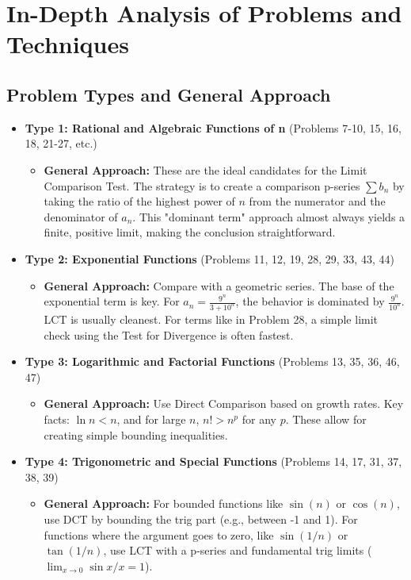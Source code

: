 \documentclass{article}
\begin{document}
\section{In-Depth Analysis of Problems and Techniques}

\subsection{Problem Types and General Approach}
\begin{itemize}
    \item \textbf{Type 1: Rational and Algebraic Functions of n} (Problems 7-10, 15, 16, 18, 21-27, etc.)
    \begin{itemize}
        \item \textbf{General Approach:} These are the ideal candidates for the Limit Comparison Test. The strategy is to create a comparison p-series \(\sum b_n\) by taking the ratio of the highest power of \(n\) from the numerator and the denominator of \(a_n\). This "dominant term" approach almost always yields a finite, positive limit, making the conclusion straightforward.
    \end{itemize}
    \item \textbf{Type 2: Exponential Functions} (Problems 11, 12, 19, 28, 29, 33, 43, 44)
    \begin{itemize}
        \item \textbf{General Approach:} Compare with a geometric series. The base of the exponential term is key. For \(a_n = \frac{9^n}{3+10^n}\), the behavior is dominated by \(\frac{9^n}{10^n}\). LCT is usually cleanest. For terms like in Problem 28, a simple limit check using the Test for Divergence is often fastest.
    \end{itemize}
    \item \textbf{Type 3: Logarithmic and Factorial Functions} (Problems 13, 35, 36, 46, 47)
    \begin{itemize}
        \item \textbf{General Approach:} Use Direct Comparison based on growth rates. Key facts: \(\ln n < n\), and for large \(n\), \(n! > n^p\) for any \(p\). These allow for creating simple bounding inequalities.
    \end{itemize}
    \item \textbf{Type 4: Trigonometric and Special Functions} (Problems 14, 17, 31, 37, 38, 39)
    \begin{itemize}
        \item \textbf{General Approach:} For bounded functions like \(\sin(n)\) or \(\cos(n)\), use DCT by bounding the trig part (e.g., between -1 and 1). For functions where the argument goes to zero, like \(\sin(1/n)\) or \(\tan(1/n)\), use LCT with a p-series and fundamental trig limits (\(\lim_{x \to 0} \sin x / x = 1\)).

\end{itemize}
\end{itemize}
\end{document}
